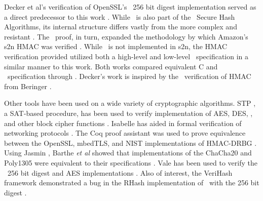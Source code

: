 Decker et al's verification of OpenSSL's \shaTwo\ 256 bit digest implementation served as a direct predecessor to this work \cite{nfm-us}.
While \shaTwo\ is also part of the \nist\ Secure Hash Algorithms, its internal structure differs vastly from the more complex and resistant \shaThree.
The \shaTwo\ proof, in turn, expanded the methodology by which Amazon's s2n HMAC was verified \cite{chudnov,s2n-blog}.
While \shaThree\ is not implemented in s2n, the HMAC verification provided utilized both a high-level and low-level \cryptol\ specification in a similar manner to this work.
Both works compared equivalent C and \cryptol\ specification through \saw.
Decker's work is inspired by the \openssl\ verification of HMAC from Beringer \cite{beringer}.

Other tools have been used on a wide variety of cryptographic algorithms.
STP \cite{stp}, a SAT-based procedure, has been used to verify implementation of AES, DES, \shaOne, and other block cipher functions \cite{auto}.
Isabelle has aided in formal verification of networking protocols \cite{isabelle,formal-protocols}.
The Coq proof assistant was used to prove equivalence between the OpenSSL, mbedTLS, and NIST implementations of HMAC-DRBG \cite{coq,verified-correctness}.
Using Jasmin \cite{jasmin}, Barthe \emph{et al} showed that implementations of the ChaCha20 and Poly1305 were equivalent to their specifications \cite{hi-assurance}.
Vale has been used to verify the \shaTwo\ 256 bit digest and AES implementations \cite{vale}.
Also of interest, the VeriHash framework demonstrated a bug in the RHash implementation of \shaThree\ with the 256 bit digest \cite{rhash,hash-functions}.
